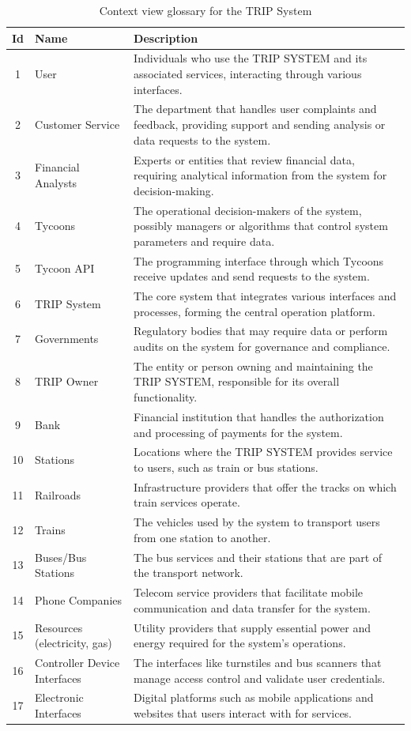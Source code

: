 \begin{table}[H]
\centering
\begin{tabular}{@{}clp{9cm}@{}}
\toprule
\textbf{Id} & \textbf{Name} & \textbf{Description} \\
\midrule
1 & User & Individuals who use the TRIP SYSTEM and its associated services, interacting through various interfaces. \\
2 & Customer Service & The department that handles user complaints and feedback, providing support and sending analysis or data requests to the system. \\
3 & Financial Analysts & Experts or entities that review financial data, requiring analytical information from the system for decision-making. \\
4 & Tycoons & The operational decision-makers of the system, possibly managers or algorithms that control system parameters and require data. \\
5 & Tycoon API & The programming interface through which Tycoons receive updates and send requests to the system. \\
6 & TRIP System & The core system that integrates various interfaces and processes, forming the central operation platform. \\
7 & Governments & Regulatory bodies that may require data or perform audits on the system for governance and compliance. \\
8 & TRIP Owner & The entity or person owning and maintaining the TRIP SYSTEM, responsible for its overall functionality. \\
9 & Bank & Financial institution that handles the authorization and processing of payments for the system. \\
10 & Stations & Locations where the TRIP SYSTEM provides service to users, such as train or bus stations. \\
11 & Railroads & Infrastructure providers that offer the tracks on which train services operate. \\
12 & Trains & The vehicles used by the system to transport users from one station to another. \\
13 & Buses/Bus Stations & The bus services and their stations that are part of the transport network. \\
14 & Phone Companies & Telecom service providers that facilitate mobile communication and data transfer for the system. \\
15 & Resources (electricity, gas) & Utility providers that supply essential power and energy required for the system’s operations. \\
16 & Controller Device Interfaces & The interfaces like turnstiles and bus scanners that manage access control and validate user credentials. \\
17 & Electronic Interfaces & Digital platforms such as mobile applications and websites that users interact with for services. \\
\bottomrule
\end{tabular}
\caption{Context view glossary for the TRIP System}
\label{tab:glossary_context_view}
\end{table}


